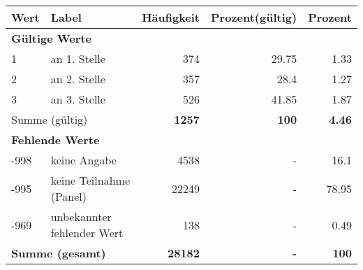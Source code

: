      \begin{longtable}{lXrrr}
     \toprule
     \textbf{Wert} & \textbf{Label} & \textbf{Häufigkeit} & \textbf{Prozent(gültig)} & \textbf{Prozent} \\
     \endhead
     \midrule
     \multicolumn{5}{l}{\textbf{Gültige Werte}}\\

     1 &
     \multicolumn{1}{X}{ an 1. Stelle   } &


       \num{374} &
       \num[round-mode=places,round-precision=2]{29.75} &
         \num[round-mode=places,round-precision=2]{1.33} \\

     2 &
     \multicolumn{1}{X}{ an 2. Stelle   } &


       \num{357} &
       \num[round-mode=places,round-precision=2]{28.4} &
         \num[round-mode=places,round-precision=2]{1.27} \\

     3 &
     \multicolumn{1}{X}{ an 3. Stelle   } &


       \num{526} &
       \num[round-mode=places,round-precision=2]{41.85} &
         \num[round-mode=places,round-precision=2]{1.87} \\
     \midrule
     \multicolumn{2}{l}{Summe (gültig)} &
       \textbf{\num{1257}} &
     \textbf{100} &
       \textbf{\num[round-mode=places,round-precision=2]{4.46}} \\
     \multicolumn{5}{l}{\textbf{Fehlende Werte}}\\
       -998 &
       keine Angabe &
         \num{4538} &
        - &
         \num[round-mode=places,round-precision=2]{16.1} \\
       -995 &
       keine Teilnahme (Panel) &
         \num{22249} &
        - &
         \num[round-mode=places,round-precision=2]{78.95} \\
       -969 &
       unbekannter fehlender Wert &
         \num{138} &
        - &
         \num[round-mode=places,round-precision=2]{0.49} \\
     \midrule
     \multicolumn{2}{l}{\textbf{Summe (gesamt)}} &
          \textbf{\num{28182}} &
        \textbf{-} &
        \textbf{100} \\
     \bottomrule
     \end{longtable}
     
